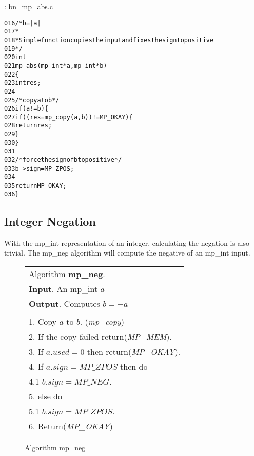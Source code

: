 \documentclass[b5paper]{book}
\begin{document}
\vspace{+3mm}\begin{small}
\hspace{-5.1mm}{\bf File}: bn\_mp\_abs.c
\vspace{-3mm}
\begin{alltt}
016   /* b = |a| 
017    *
018    * Simple function copies the input and fixes the sign to positive
019    */
020   int
021   mp_abs (mp_int * a, mp_int * b)
022   \{
023     int     res;
024   
025     /* copy a to b */
026     if (a != b) \{
027        if ((res = mp_copy (a, b)) != MP_OKAY) \{
028          return res;
029        \}
030     \}
031   
032     /* force the sign of b to positive */
033     b->sign = MP_ZPOS;
034   
035     return MP_OKAY;
036   \}
\end{alltt}
\end{small}

\subsection{Integer Negation}
With the mp\_int representation of an integer, calculating the negation is also trivial.  The mp\_neg algorithm will compute
the negative of an mp\_int input.

\begin{figure}[here]
\begin{center}
\begin{tabular}{l}
\hline Algorithm \textbf{mp\_neg}. \\
\textbf{Input}.   An mp\_int $a$ \\
\textbf{Output}.  Computes $b = -a$ \\
\hline \\
1.  Copy $a$ to $b$.  (\textit{mp\_copy}) \\
2.  If the copy failed return(\textit{MP\_MEM}). \\
3.  If $a.used = 0$ then return(\textit{MP\_OKAY}). \\
4.  If $a.sign = MP\_ZPOS$ then do \\
\hspace{3mm}4.1  $b.sign = MP\_NEG$. \\
5.  else do \\
\hspace{3mm}5.1  $b.sign = MP\_ZPOS$. \\
6.  Return(\textit{MP\_OKAY}) \\
\hline
\end{tabular}
\end{center}
\caption{Algorithm mp\_neg}
\end{figure}
\end{document}
